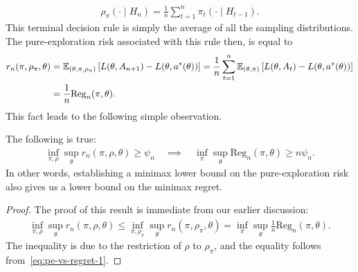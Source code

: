 \documentclass[12pt]{article}
\begin{document}
\begin{align}
\rho_{\pi}(\cdot \mid H_n) = \frac{1}{n} \sum_{t=1}^n \pi_t(\cdot \mid H_{t-1}). 
\end{align}
This terminal decision rule is simply the average of all the sampling distributions. The pure-exploration risk associated with this rule then, is equal to 
\begin{align}
r_n(\pi, \rho_\pi, \theta) &= \mathbb{E}_{(\theta, \pi, \rho_\pi)}\left[ L(\theta, A_{n+1}) - L(\theta, a^*(\theta)) \right] = \frac{1}{n} \sum_{t=1}^n \mathbb{E}_{(\theta, \pi)} \left[ L(\theta, A_t) - L(\theta, a^*(\theta))\right] \\ &= \frac{1}{n} \mathrm{Reg}_n(\pi, \theta). \label{eq:pe-vs-regret-1}
\end{align}
This fact leads to the following simple observation. 
\begin{proposition}
\label{prop:pe-to-regret} The following is true: 
\begin{align}
\inf_{\pi, \rho} \sup_{\theta} r_n(\pi, \rho, \theta) \geq \psi_n \quad \implies \quad \inf_{\pi} \sup_{\theta} \mathrm{Reg}_n(\pi, \theta) \geq n \psi_n. 
\end{align}
In other words, establishing a minimax lower bound on the pure-exploration risk also gives us a lower bound on the minimax regret. 
\end{proposition}
\begin{proof}
The proof of this result is immediate from our earlier discussion: 
\begin{align}
\inf_{\pi, \rho} \sup_{\theta} r_n(\pi, \rho, \theta) \leq \inf_{\pi, \rho_{\pi}} \sup_{\theta} r_n(\pi, \rho_\pi, \theta) = \inf_{\pi } \sup_{\theta} \frac{1}{n} \mathrm{Reg}_n(\pi, \theta). 
\end{align}
The  inequality is due to the restriction of $\rho$ to $\rho_\pi$, and the equality follows from~\eqref{eq:pe-vs-regret-1}. 
\end{proof}


\end{document}
